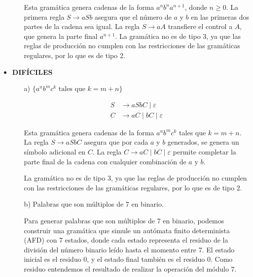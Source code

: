\documentclass[12pt]{report} %
\begin{document}
\begin{ejercicio}
\begin{itemize}
\begin{itemize}
\begin{solucion}[media.d]
        Esta gramática genera cadenas de la forma $a^n b^n a^{n+1}$, donde $n \geq 0$. La primera regla $S \rightarrow aSb$ asegura que el número de $a$ y $b$ en las primeras dos partes de la cadena sea igual. La regla $S \rightarrow aA$ transfiere el control a $A$, que genera la parte final $a^{n+1}$. La gramática no es de tipo 3, ya que las reglas de producción no cumplen con las restricciones de las gramáticas regulares, por lo que es de tipo 2.

        \end{solucion}


    \end{itemize}

    \item \textbf{DIFÍCILES}
    \begin{itemize}
        \item[a)] $\{a^n b^m c^k \text{ tales que } k = m + n\}$


        \begin{solucion}[difícil.a]

        \begin{align*}
        S &\rightarrow aSbC \mid \varepsilon \\
        C &\rightarrow aC \mid bC \mid \varepsilon
        \end{align*}

        Esta gramática genera cadenas de la forma $a^n b^m c^k$ tales que $k = m + n$. La regla $S \rightarrow aSbC$ asegura que por cada $a$ y $b$ generados, se genera un símbolo adicional en $C$. La regla $C \rightarrow aC \mid bC \mid \varepsilon$ permite completar la parte final de la cadena con cualquier combinación de $a$ y $b$.

        La gramática no es de tipo 3, ya que las reglas de producción no cumplen con las restricciones de las gramáticas regulares, por lo que es de tipo 2.

        \end{solucion}



        \item[b)] Palabras que son múltiplos de 7 en binario.


        \begin{solucion}[difícil.b]

        Para generar palabras que son múltiplos de 7 en binario, podemos construir una gramática que simule un autómata finito determinista (AFD) con 7 estados, donde cada estado representa el residuo de la división del número binario leído hasta el momento entre 7. El estado inicial es el residuo 0, y el estado final también es el residuo 0. Como residuo entendemos el resultado de realizar la operación del módulo 7.


\end{solucion}
\end{itemize}
\end{itemize}
\end{ejercicio}
\end{document}
